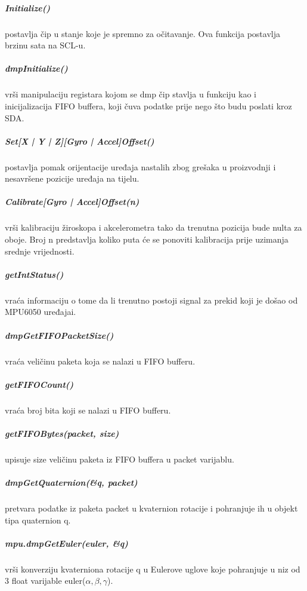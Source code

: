 \documentclass[../Document.tex]{subfiles}
\begin{document}
\subparagraph{Initialize()} \noindent postavlja čip u stanje koje je spremno za očitavanje. Ova funkcija postavlja brzinu sata na SCL-u.

\subparagraph{dmpInitialize()} \noindent vrši manipulaciju registara kojom se dmp čip stavlja u funkciju kao i inicijalizacija FIFO buffera, koji čuva podatke prije nego što budu poslati kroz SDA.

\subparagraph{Set[X | Y | Z][Gyro | Accel]Offset()} \noindent postavlja pomak orijentacije uređaja nastalih zbog grešaka u proizvodnji i nesavršene pozicije uređaja na tijelu.

\subparagraph{Calibrate[Gyro | Accel]Offset(n)} \noindent vrši kalibraciju žiroskopa i akcelerometra tako da trenutna pozicija bude nulta za oboje. Broj n predstavlja koliko puta će se ponoviti kalibracija prije uzimanja srednje vrijednosti.

\subparagraph{getIntStatus()} \noindent vraća informaciju o tome da li trenutno postoji signal za prekid koji je došao od MPU6050 uređajai.

\subparagraph{dmpGetFIFOPacketSize()} \noindent vraća veličinu paketa koja se nalazi u FIFO bufferu.

\subparagraph{getFIFOCount()} \noindent vraća broj bita koji se nalazi u FIFO bufferu.

\subparagraph{getFIFOBytes(packet, size)} \noindent upisuje size veličinu paketa iz FIFO buffera u packet varijablu.

\subparagraph{dmpGetQuaternion(\&q, packet)} \noindent pretvara podatke iz paketa packet u kvaternion rotacije i pohranjuje ih u objekt tipa quaternion q.

\subparagraph{mpu.dmpGetEuler(euler, \&q)} \noindent vrši konverziju kvaterniona rotacije q u Eulerove uglove koje pohranjuje u niz od 3 float varijable euler($\alpha,\beta,\gamma$).
\end{document}
